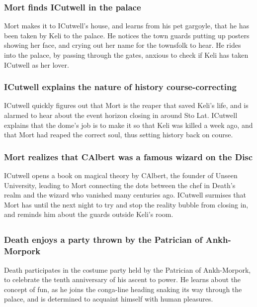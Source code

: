 \subsubsection{\Gls{Mort} finds \Gls{ICutwell} in the palace}
\Gls{Mort} makes it to \Gls{ICutwell}'s house, and learns from his pet gargoyle, that he has been
taken by \Gls{Keli} to the palace. He notices the town guards putting up posters showing her face,
and crying out her name for the townsfolk to hear. He rides into the palace, by passing through the
gates, anxious to check if \Gls{Keli} has taken \Gls{ICutwell} as her lover.

\subsubsection{\Gls{ICutwell} explains the nature of history course-correcting}
\Gls{ICutwell} quickly figures out that \Gls{Mort} is the reaper that saved \Gls{Keli}'s life,
and is alarmed to hear about the event horizon closing in around Sto Lat. \Gls{ICutwell} explains
that the dome's job is to make it so that \Gls{Keli} was killed a week ago, and that \Gls{Mort}
had reaped the correct soul, thus setting history back on course.

\subsubsection{\Gls{Mort} realizes that \Gls{CAlbert} was a famous wizard on the Disc}
\Gls{ICutwell} opens a book on magical theory by \Gls{CAlbert}, the founder of Unseen University,
leading to \Gls{Mort} connecting the dots between the chef in \Gls{Death}'s realm and the wizard
who vanished many centuries ago. \Gls{ICutwell} surmises that \Gls{Mort} has until the next night
to try and stop the reality bubble from closing in, and reminds him about the guards outside
\Gls{Keli}'s room.

\subsection{}
\subsubsection{\Gls{Death} enjoys a party thrown by the Patrician of Ankh-Morpork}
\Gls{Death} participates in the costume party held by the Patrician of Ankh-Morpork, to celebrate
the tenth anniversary of his ascent to power. He learns about the concept of fun, as he joins the
conga-line heading snaking its way through the palace, and is determined to acquaint himself with
human pleasures.

